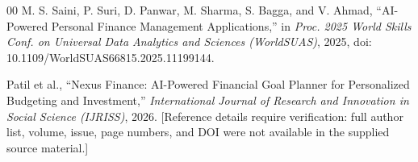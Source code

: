 \documentclass[conference]{IEEEtran}
\begin{document}
\begin{thebibliography}{00}
M. S. Saini, P. Suri, D. Panwar, M. Sharma, S. Bagga, and V. Ahmad, ``AI-Powered Personal Finance Management Applications,'' in \emph{Proc. 2025 World Skills Conf. on Universal Data Analytics and Sciences (WorldSUAS)}, 2025, doi: 10.1109/WorldSUAS66815.2025.11199144.

Patil et al., ``Nexus Finance: AI-Powered Financial Goal Planner for Personalized Budgeting and Investment,'' \emph{International Journal of Research and Innovation in Social Science (IJRISS)}, 2026. [Reference details require verification: full author list, volume, issue, page numbers, and DOI were not available in the supplied source material.]

\end{thebibliography}

%
\end{document}
